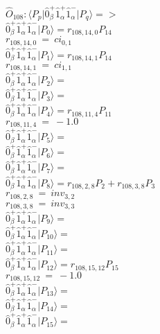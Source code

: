 \documentclass[14pt]{article}
\begin{document}
    $\hat{O}_{108}:  \langle{P_p}\vert \hat{0}_{\beta}^{+}\hat{1}_{\alpha}^{+}\hat{1}_{\alpha}^{-} \vert{P_q}\rangle => $ \\ 
    $ \hat{0}_{\beta}^{+}\hat{1}_{\alpha}^{+}\hat{1}_{\alpha}^{-} \vert{P_{0}}\rangle = {r}_{108,14,0}P_{14} $ \\ 
    ${r}_{108,14,0}\ =\ {ci}_{0,1} $ \\ 
    $ \hat{0}_{\beta}^{+}\hat{1}_{\alpha}^{+}\hat{1}_{\alpha}^{-} \vert{P_{1}}\rangle = {r}_{108,14,1}P_{14} $ \\ 
    ${r}_{108,14,1}\ =\ {ci}_{1,1} $ \\ 
    $ \hat{0}_{\beta}^{+}\hat{1}_{\alpha}^{+}\hat{1}_{\alpha}^{-} \vert{P_{2}}\rangle =  $ \\ 
    $ \hat{0}_{\beta}^{+}\hat{1}_{\alpha}^{+}\hat{1}_{\alpha}^{-} \vert{P_{3}}\rangle =  $ \\ 
    $ \hat{0}_{\beta}^{+}\hat{1}_{\alpha}^{+}\hat{1}_{\alpha}^{-} \vert{P_{4}}\rangle = {r}_{108,11,4}P_{11} $ \\ 
    ${r}_{108,11,4}\ =\ -1.0 $ \\ 
    $ \hat{0}_{\beta}^{+}\hat{1}_{\alpha}^{+}\hat{1}_{\alpha}^{-} \vert{P_{5}}\rangle =  $ \\ 
    $ \hat{0}_{\beta}^{+}\hat{1}_{\alpha}^{+}\hat{1}_{\alpha}^{-} \vert{P_{6}}\rangle =  $ \\ 
    $ \hat{0}_{\beta}^{+}\hat{1}_{\alpha}^{+}\hat{1}_{\alpha}^{-} \vert{P_{7}}\rangle =  $ \\ 
    $ \hat{0}_{\beta}^{+}\hat{1}_{\alpha}^{+}\hat{1}_{\alpha}^{-} \vert{P_{8}}\rangle = {r}_{108,2,8}P_{2}+{r}_{108,3,8}P_{3} $ \\ 
    ${r}_{108,2,8}\ =\ {inv}_{3,2} $ \\ 
    ${r}_{108,3,8}\ =\ {inv}_{3,3} $ \\ 
    $ \hat{0}_{\beta}^{+}\hat{1}_{\alpha}^{+}\hat{1}_{\alpha}^{-} \vert{P_{9}}\rangle =  $ \\ 
    $ \hat{0}_{\beta}^{+}\hat{1}_{\alpha}^{+}\hat{1}_{\alpha}^{-} \vert{P_{10}}\rangle =  $ \\ 
    $ \hat{0}_{\beta}^{+}\hat{1}_{\alpha}^{+}\hat{1}_{\alpha}^{-} \vert{P_{11}}\rangle =  $ \\ 
    $ \hat{0}_{\beta}^{+}\hat{1}_{\alpha}^{+}\hat{1}_{\alpha}^{-} \vert{P_{12}}\rangle = {r}_{108,15,12}P_{15} $ \\ 
    ${r}_{108,15,12}\ =\ -1.0 $ \\ 
    $ \hat{0}_{\beta}^{+}\hat{1}_{\alpha}^{+}\hat{1}_{\alpha}^{-} \vert{P_{13}}\rangle =  $ \\ 
    $ \hat{0}_{\beta}^{+}\hat{1}_{\alpha}^{+}\hat{1}_{\alpha}^{-} \vert{P_{14}}\rangle =  $ \\ 
    $ \hat{0}_{\beta}^{+}\hat{1}_{\alpha}^{+}\hat{1}_{\alpha}^{-} \vert{P_{15}}\rangle =  $ \\ 
    
\end{document}
